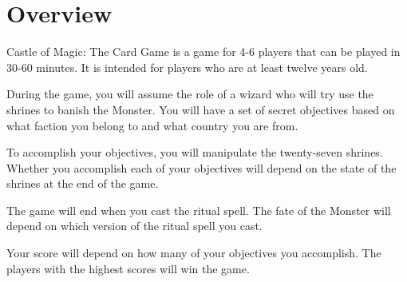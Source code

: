 \documentclass[10pt, parskip=half-, twoside]{scrartcl}
\begin{document}
\newpage

\section*{Overview}
Castle of Magic: The Card Game is a game for 4-6 players that can be played in 30-60 minutes. It is intended for players who are at least twelve years old.

During the game, you will assume the role of a wizard who will try use the shrines to banish the Monster. You will have a set of secret objectives based on what faction you belong to and what country you are from.

To accomplish your objectives, you will manipulate the twenty-seven shrines. Whether you accomplish each of your objectives will depend on the state of the shrines at the end of the game.

The game will end when you cast the ritual spell. The fate of the Monster will depend on which version of the ritual spell you cast.

Your score will depend on how many of your objectives you accomplish. The players with the highest scores will win the game.

\newpage
\end{document}
